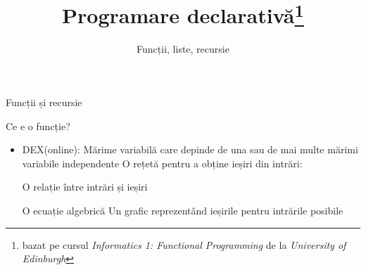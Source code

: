 \documentclass[handout,xcolor=pdftex,romanian,colorlinks]{beamer}
\title[PD---Baze]{Programare declarativă\thanks{bazat pe cursul \emph{Informatics 1: Functional Programming} de la \emph{University of Edinburgh}}}
\subtitle{Funcții, liste, recursie}
\begin{document}
\begin{frame}
  \titlepage
\end{frame}

\begin{section}{Funcții și recursie}
\begin{frame}{Ce e o funcție?}
\begin{itemize}
\item DEX(online): Mărime variabilă care depinde de una sau de mai multe mărimi variabile independente
\vitem O rețetă pentru a obține ieșiri din intrări: 
\hfill {}

\vitem O relație între intrări și ieșiri
      \hfill {} 
      
\vitem O ecuație algebrică \hfill {}
\vitem Un grafic reprezentând ieșirile pentru intrările posibile
 \pgfplotsset{height=5cm}
\end{itemize}
\end{frame}


\end{section}
\end{document}
